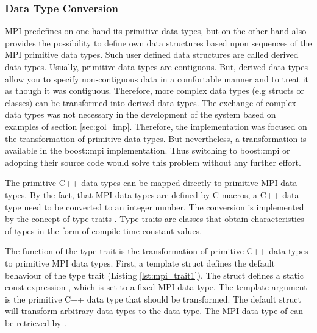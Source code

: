 \subsubsection{Data Type Conversion}
\label{sec:data_type_conversion}
MPI predefines on one hand its primitive data types, but on the other
hand also provides the possibility to define own data structures based
upon sequences of the MPI primitive data types. Such user defined data
structures are called derived data types. Usually, primitive data
types are contiguous. But, derived data types allow you to specify
non-contiguous data in a comfortable manner and to treat it as though
it was contiguous.  Therefore, more complex data types (e.g structs or
classes) can be transformed into derived data types. The exchange
of complex data types was not necessary in the development of the
system based on examples of section \ref{sec:gol_imp}. Therefore, the
implementation was focused on the transformation of primitive data
types.  But nevertheless, a transformation is available in the
boost::mpi \cite{ref:boost_mpi} implementation. Thus switching to
boost::mpi or adopting their source code would solve this problem
without any further effort.

The primitive C++ data types can be mapped directly to primitive MPI
data types. By the fact, that MPI data types are defined by C macros,
a C++ data type need to be converted to an integer number. The
conversion is implemented by the concept of type traits
\cite{ref:type_trait}.  Type traits are classes that obtain
characteristics of types in the form of compile-time constant values.

The function of the type trait is the transformation of primitive C++
data types to primitive MPI data types.  First, a template struct
defines the default behaviour of the type trait (Listing
\ref{lst:mpi_trait1}). The struct defines a static const expression
, which is set to a fixed MPI data type. The template
argument  is the primitive C++ data type that should be
transformed. The default struct will transform arbitrary data types
 to the  data type. The MPI data type of
 can be retrieved by .


